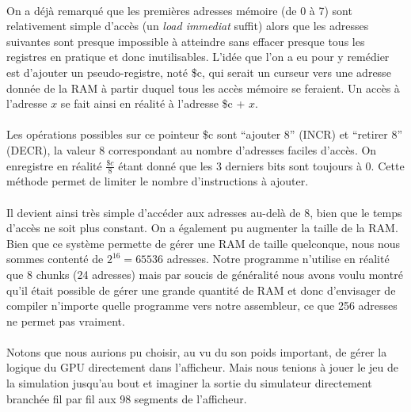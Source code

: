 \documentclass{article}
\begin{document}
\paragraph{}On a déjà remarqué que les premières adresses mémoire (de 0 à 7) sont relativement simple d'accès (un \emph{load immediat} suffit) alors que les adresses suivantes sont presque impossible à atteindre sans effacer presque tous les registres en pratique et donc inutilisables. L'idée que l'on a eu pour y remédier est d'ajouter un pseudo-registre, noté \$c, qui serait un curseur vers une adresse donnée de la RAM à partir duquel tous les accès mémoire se feraient. Un accès à l'adresse $x$ se fait ainsi en réalité à l'adresse \$c + $x$.

\paragraph{}Les opérations possibles sur ce pointeur \$c sont “ajouter 8” (INCR) et “retirer 8” (DECR), la valeur 8 correspondant au nombre d'adresses faciles d'accès. On enregistre en réalité $\frac{\$c}8$ étant donné que les 3 derniers bits sont toujours à 0. Cette méthode permet de limiter le nombre d'instructions à ajouter.

\paragraph{}Il devient ainsi très simple d'accéder aux adresses au-delà de 8, bien que le temps d'accès ne soit plus constant. On a également pu augmenter la taille de la RAM. Bien que ce système permette de gérer une RAM de taille quelconque, nous nous sommes contenté de $2^16 = 65536$ adresses. Notre programme n'utilise en réalité que 8 chunks (24 adresses) mais par soucis de généralité nous avons voulu montré qu'il était possible de gérer une grande quantité de RAM et donc d'envisager de compiler n'importe quelle programme vers notre assembleur, ce que 256 adresses ne permet pas vraiment.

\paragraph{}Notons que nous aurions pu choisir, au vu du son poids important, de gérer la logique du GPU directement dans l'afficheur. Mais nous tenions à jouer le jeu de la simulation jusqu'au bout et imaginer la sortie du simulateur directement branchée fil par fil aux 98 segments de l'afficheur.
\end{document}
